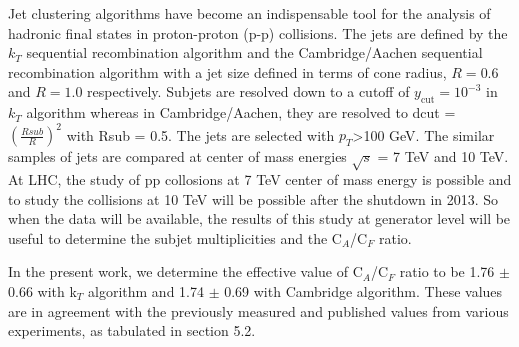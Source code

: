 Jet clustering algorithms have become an indispensable tool for the analysis of hadronic
final states in proton-proton (p-p) collisions. The jets are defined by the $k_{T}$ sequential recombination algorithm and the Cambridge/Aachen sequential recombination algorithm  with a jet size defined in terms of cone radius, $R=0.6$ and $R=1.0$ respectively. 
Subjets are resolved down to a cutoff of $y_\mathrm{cut} = 10^{-3}$ in $k_{T}$ algorithm whereas in Cambridge/Aachen, they are resolved to dcut = $(\frac{Rsub}{R})^{2}$ with Rsub = 0.5. The jets are selected with $p_{T}$>100 GeV. The similar samples of jets are compared at center of mass energies $\sqrt{s}$ = 7 TeV and 10 TeV. At LHC, the study of pp collosions at 7 TeV center of mass energy is possible and to study the collisions at 10 TeV will be possible after the shutdown in 2013. So when the data will be available, the results of this study at generator level will be useful to determine the subjet multiplicities and the C$_{A}$/C$_{F}$ ratio. 

In the present work, we determine the effective value of C$_{A}$/C$_{F}$ ratio to be 1.76 $\pm$ 0.66 with k$_{T}$ algorithm and 1.74 $\pm$ 0.69 with Cambridge algorithm. These values are in agreement with the previously measured and published values from various experiments, as tabulated in section 5.2.
  

\newpage

